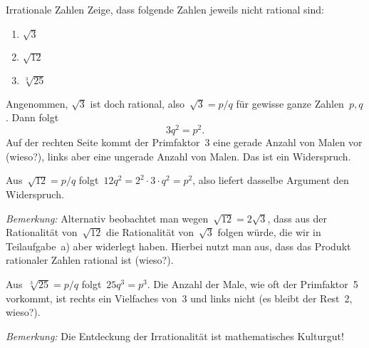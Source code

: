 \documentclass{algblatt}
\begin{document}

\begin{aufgabe}{Irrationale Zahlen}
Zeige, dass folgende Zahlen jeweils nicht rational sind:
\begin{enumerate}
\item $\sqrt{3}$
\item $\sqrt{12}$
\item $\sqrt[3]{25}$
\end{enumerate}
\begin{loesungE}
\item Angenommen, $\sqrt{3}$ ist doch rational, also~$\sqrt{3} = p/q$ für
gewisse ganze Zahlen~$p,q$. Dann folgt
\[ 3 q^2 = p^2. \]
Auf der rechten Seite kommt der Primfaktor~3 eine gerade Anzahl von Malen vor
(wieso?), links aber eine ungerade Anzahl von Malen. Das ist ein Widerspruch.
\item Aus~$\sqrt{12} = p/q$ folgt~$12 q^2 = 2^2 \cdot 3 \cdot q^2 = p^2$, also
liefert dasselbe Argument den Widerspruch.

\emph{Bemerkung:} Alternativ beobachtet man wegen~$\sqrt{12} = 2 \sqrt{3}$,
dass aus der Rationalität von~$\sqrt{12}$ die Rationalität von~$\sqrt{3}$
folgen würde, die wir in Teilaufgabe~a) aber widerlegt haben. Hierbei nutzt man
aus, dass das Produkt rationaler Zahlen rational ist (wieso?).

\item Aus~$\sqrt[3]{25} = p/q$ folgt~$25 q^3 = p^3$. Die Anzahl der Male, wie
oft der Primfaktor~5 vorkommt, ist rechts ein Vielfaches von~3 und links nicht
(es bleibt der Rest~2, wieso?).
\end{loesungE}

\emph{Bemerkung:} Die Entdeckung der Irrationalität ist mathematisches
Kulturgut!
\end{aufgabe}
\end{document}
